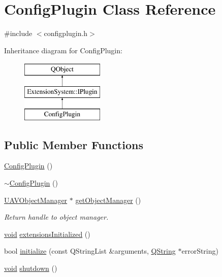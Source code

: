 \hypertarget{class_config_plugin}{\section{Config\-Plugin Class Reference}
\label{class_config_plugin}
}


{\ttfamily \#include $<$configplugin.\-h$>$}

Inheritance diagram for Config\-Plugin\-:\begin{figure}[H]
\begin{center}
\leavevmode
\includegraphics[height=3.000000cm]{class_config_plugin}
\end{center}
\end{figure}
\subsection*{Public Member Functions}
\begin{DoxyCompactItemize}
\item 
\hyperlink{group___config_plugin_ga7d360f4053aa997f911f4b8d5b9beddc}{Config\-Plugin} ()
\item 
\hyperlink{group___config_plugin_gabe1cf1e86b64f31b77b147614d70cb2d}{$\sim$\-Config\-Plugin} ()
\item 
\hyperlink{class_u_a_v_object_manager}{U\-A\-V\-Object\-Manager} $\ast$ \hyperlink{group___config_plugin_ga4b72a360021dcddf63bd9dc3566930bf}{get\-Object\-Manager} ()
\begin{DoxyCompactList}\small\item\em Return handle to object manager. \end{DoxyCompactList}\item 
\hyperlink{group___u_a_v_objects_plugin_ga444cf2ff3f0ecbe028adce838d373f5c}{void} \hyperlink{group___config_plugin_gabbca0b710aa7b4870df57f979e248833}{extensions\-Initialized} ()
\item 
bool \hyperlink{group___config_plugin_ga6caac2a6d708537fbabed44ad35e694f}{initialize} (const Q\-String\-List \&arguments, \hyperlink{group___u_a_v_objects_plugin_gab9d252f49c333c94a72f97ce3105a32d}{Q\-String} $\ast$error\-String)
\item 
\hyperlink{group___u_a_v_objects_plugin_ga444cf2ff3f0ecbe028adce838d373f5c}{void} \hyperlink{group___config_plugin_gaf7af8833b63795f7bb96fd43bf74fb3e}{shutdown} ()
\end{DoxyCompactItemize}


